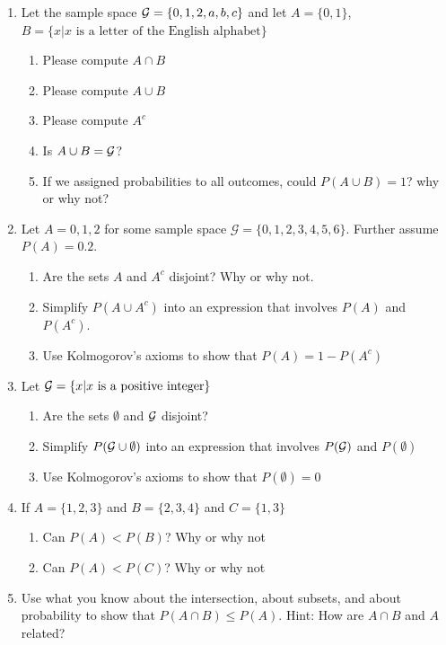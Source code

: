 \begin{enumerate}
    \item Let the sample space $\mathcal{G} = \{0,1,2,a,b,c\}$ and let $A=\{0,1\}$, $B=\{x | x\text{ is a letter of the English alphabet}\}$
    \begin{enumerate}
        \item Please compute $A \cap B$
        \item Please compute $A \cup B$
        \item Please compute $A^{c}$
        \item Is $A \cup B = \mathcal{G}$?
        \item If we assigned probabilities to all outcomes, could $P(A \cup B) = 1$? why or why not?
    \end{enumerate}
    
    \item Let $A = {0,1,2}$ for some sample space $\mathcal{G} = \{0,1,2,3,4,5,6\}$. Further assume $P(A) = 0.2$. 
    \begin{enumerate}
        \item Are the sets $A$ and $A^{c}$ disjoint? Why or why not.
        \item Simplify $P(A \cup A^{c})$ into an expression that involves $P(A)$ and $P(A^{c})$.
        \item Use Kolmogorov's axioms to show that $P(A) = 1 - P(A^{c})$ 
    \end{enumerate}
    
    \item Let $\mathcal{G} = \{x | x\text{ is a positive integer}\}$
    \begin{enumerate}
        \item Are the sets $\emptyset$ and $\mathcal{G}$ disjoint?
        \item Simplify $P(\mathcal{G} \cup \emptyset)$ into an expression that involves $P(\mathcal{G})$ and $P(\emptyset)$
        \item Use Kolmogorov's axioms to show that $P(\emptyset) = 0$
    \end{enumerate}
    
    \item If $A=\{1,2,3\}$ and $B = \{2,3,4\}$ and $C = \{1,3\}$
    \begin{enumerate}
        \item Can $P(A) < P(B)$? Why or why not
        \item Can $P(A) < P(C)$? Why or why not
    \end{enumerate}
    \item Use what you know about the intersection, about subsets, and about probability to show that $P(A \cap B) \leq P(A)$. Hint: How are $A \cap B$ and $A$ related?
    

\end{enumerate}
